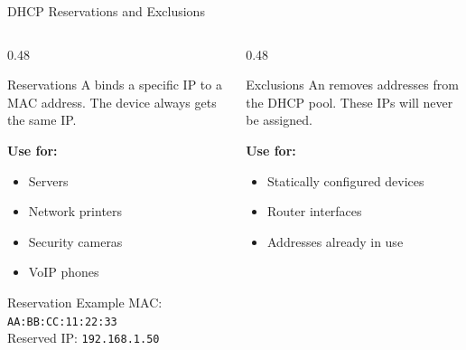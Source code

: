 \documentclass[aspectratio=169]{beamer}  %
\begin{document}
\begin{frame}{DHCP Reservations and Exclusions}
    \begin{columns}[T]
        \begin{column}{0.48\textwidth}
            \begin{block}{Reservations}
                \small
                A  binds a specific IP to a MAC address. The device always gets the same IP.
                
                \vspace{0.2em}
                \textbf{Use for:}
                \begin{itemize}\setlength{\itemsep}{1pt}
                    \item Servers
                    \item Network printers
                    \item Security cameras
                    \item VoIP phones
                \end{itemize}
            \end{block}
            
            \vspace{0.2em}
            \begin{exampleblock}{Reservation Example}
                \small
                MAC: \texttt{AA:BB:CC:11:22:33} \\
                Reserved IP: \texttt{192.168.1.50}
            \end{exampleblock}
        \end{column}
        \begin{column}{0.48\textwidth}
            \begin{block}{Exclusions}
                \small
                An  removes addresses from the DHCP pool. These IPs will never be assigned.
                
                \vspace{0.2em}
                \textbf{Use for:}
                \begin{itemize}\setlength{\itemsep}{1pt}
                    \item Statically configured devices
                    \item Router interfaces
                    \item Addresses already in use
                \end{itemize}
            \end{block}
            

\end{column}
\end{columns}
\end{frame}
\end{document}
